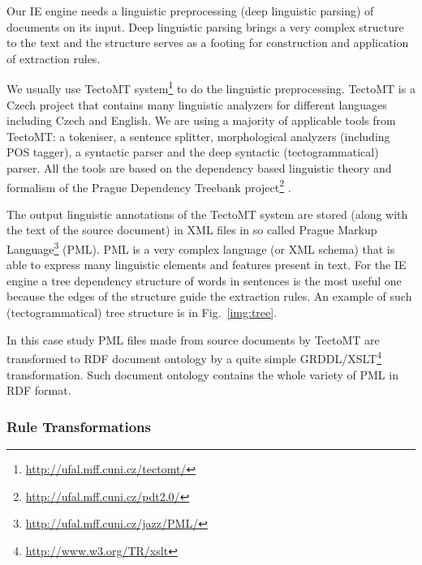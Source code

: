 \documentclass[10pt, conference, compsocconf]{IEEEtran}
\begin{document}
Our IE engine needs a linguistic preprocessing (deep linguistic parsing) of documents on its input. Deep linguistic parsing brings a very complex structure to the text and the structure serves as a footing for construction and application of extraction rules. 

We usually use TectoMT system\footnote{\url{http://ufal.mff.cuni.cz/tectomt/}} \cite{dedek:ZaPtTectoMTHighly2008} to do the linguistic preprocessing. TectoMT is a Czech project that contains many linguistic analyzers for different languages including Czech and English. We are using a majority of applicable tools from TectoMT: a tokeniser, a sentence splitter, morphological analyzers (including POS tagger), a syntactic parser and the deep syntactic (tectogrammatical) parser. All the tools are based on the dependency based linguistic theory and formalism of the Prague Dependency Treebank project\footnote{\url{http://ufal.mff.cuni.cz/pdt2.0/}} \cite{dedek:PDT20_CD}.

The output linguistic annotations of the TectoMT system are stored (along with the text of the source document) in XML files in so called Prague Markup Language\footnote{\url{http://ufal.mff.cuni.cz/jazz/PML/}} (PML). PML is a very complex language (or XML schema) that is able to express many linguistic elements and features present in text. For the IE engine a tree dependency structure of words in sentences is the most useful one because the edges of the structure guide the extraction rules. An example of such (tectogrammatical) tree structure is in Fig.~\ref{img:tree}.

In this case study PML files made from source documents by TectoMT are transformed to RDF document ontology by a quite simple GRDDL/XSLT\footnote{\url{http://www.w3.org/TR/xslt}} transformation. Such document ontology contains the whole variety of PML in RDF format.







\subsubsection{Rule Transformations}
\end{document}
